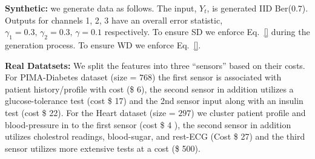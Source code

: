 {\bf Synthetic:} we generate data as follows. The input, $Y_t$, is generated IID Ber($0.7$). Outputs for channels 1, 2, 3 have an overall error statistic, $\gamma_1 = 0.3,\,\gamma_2=0.3,\,\gamma=0.1$ respectively. To ensure SD we enforce Eq.~\ref{} during the generation process. To ensure WD we enforce Eq.~\ref{}.  %

{\bf Real Datatsets:} %
We split the features into three ``sensors'' based on their costs. For PIMA-Diabetes dataset (size = $768$) the first sensor is associated with patient history/profile with cost (\$ 6), the second sensor in addition utilizes a glucose-tolerance test (cost \$ 17) and the 2nd sensor input along with an insulin test (cost \$ 22). For the Heart dataset (size = $297$) we cluster patient profile and blood-pressure in to the first sensor (cost \$ 4 ), the second sensor in addition utilizes cholestrol readings, blood-sugar, and rest-ECG (Cost \$ 27) and the third sensor utilizes more extensive tests at a cost (\$ 500). 


